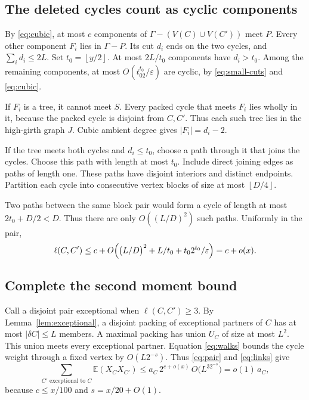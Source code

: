 \documentclass[11pt,a4paper]{article}
\numberwithin{equation}{section}
\theoremstyle{definition}
\theoremstyle{remark}
\newcommand{\E}{\mathbb E}
\newcommand{\eps}{\varepsilon}
\newcommand{\floor}[1]{\left\lfloor#1\right\rfloor}
\begin{document}
\subsection{The deleted cycles count as cyclic components}\label{sec:links}
By \eqref{eq:cubic}, at most $c$ components of $\Gamma-(V(C)\cup V(C'))$ meet $P$. Every other component $F_i$ lies in $\Gamma-P$. Its cut $d_i$ ends on the two cycles, and $\sum_id_i\le2L$. Set $t_0=\floor{y/2}$. At most $2L/t_0$ components have $d_i>t_0$. Among the remaining components, at most $O(t_02^{t_0}/\eps)$ are cyclic, by \eqref{eq:small-cuts} and \eqref{eq:cubic}.

If $F_i$ is a tree, it cannot meet $S$. Every packed cycle that meets $F_i$ lies wholly in it, because the packed cycle is disjoint from $C,C'$. Thus each such tree lies in the high-girth graph $J$. Cubic ambient degree gives $|F_i|=d_i-2$.

If the tree meets both cycles and $d_i\le t_0$, choose a path through it that joins the cycles. Choose this path with length at most $t_0$. Include direct joining edges as paths of length one. These paths have disjoint interiors and distinct endpoints. Partition each cycle into consecutive vertex blocks of size at most $\floor{D/4}$.

Two paths between the same block pair would form a cycle of length at most $2t_0+D/2<D$. Thus there are only $O((L/D)^2)$ such paths. Uniformly in the pair,
\begin{equation}\label{eq:links}
 \ell(C,C')\le c+O\Bigl(\bigl(L/D\bigr)^2+L/t_0+t_02^{t_0}/\eps\Bigr)=c+o(x).
\end{equation}

\subsection{Complete the second moment bound}\label{sec:second}
Call a disjoint pair exceptional when $\ell(C,C')\ge3$. By Lemma~\ref{lem:exceptional}, a disjoint packing of exceptional partners of $C$ has at most $|\delta C|\le L$ members. A maximal packing has union $U_C$ of size at most $L^2$. This union meets every exceptional partner. Equation \eqref{eq:walks} bounds the cycle weight through a fixed vertex by $O(L2^{-s})$. Thus \eqref{eq:pair} and \eqref{eq:links} give
\begin{equation}\label{eq:exceptional-sum}
 \sum_{C'\text{ exceptional to }C}\E(X_CX_{C'})\le a_C\,2^{c+o(x)}\,O\bigl(L^32^{-s}\bigr)=o(1)\,a_C,
\end{equation}
because $c\le x/100$ and $s=x/20+O(1)$.
\end{document}
